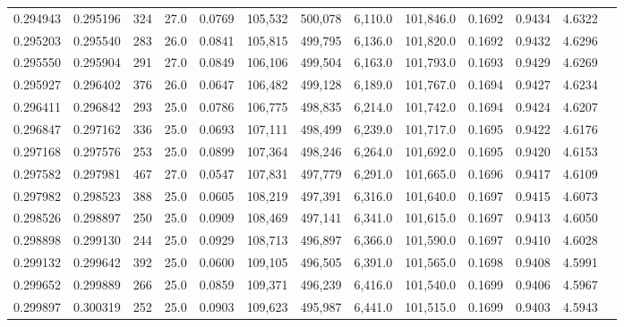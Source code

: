 \begin{tabular}{rrrrrrrrrrrrr}
0.294943 & 0.295196 &   324 & 27.0 &                                     0.0769 & 105,532 & 500,078 &   6,110.0 & 101,846.0 & 0.1692 & 0.9434 & 4.6322 \\
0.295203 & 0.295540 &   283 & 26.0 &                                     0.0841 & 105,815 & 499,795 &   6,136.0 & 101,820.0 & 0.1692 & 0.9432 & 4.6296 \\
0.295550 & 0.295904 &   291 & 27.0 &                                     0.0849 & 106,106 & 499,504 &   6,163.0 & 101,793.0 & 0.1693 & 0.9429 & 4.6269 \\
0.295927 & 0.296402 &   376 & 26.0 &                                     0.0647 & 106,482 & 499,128 &   6,189.0 & 101,767.0 & 0.1694 & 0.9427 & 4.6234 \\
0.296411 & 0.296842 &   293 & 25.0 &                                     0.0786 & 106,775 & 498,835 &   6,214.0 & 101,742.0 & 0.1694 & 0.9424 & 4.6207 \\
0.296847 & 0.297162 &   336 & 25.0 &                                     0.0693 & 107,111 & 498,499 &   6,239.0 & 101,717.0 & 0.1695 & 0.9422 & 4.6176 \\
0.297168 & 0.297576 &   253 & 25.0 &                                     0.0899 & 107,364 & 498,246 &   6,264.0 & 101,692.0 & 0.1695 & 0.9420 & 4.6153 \\
0.297582 & 0.297981 &   467 & 27.0 &                                     0.0547 & 107,831 & 497,779 &   6,291.0 & 101,665.0 & 0.1696 & 0.9417 & 4.6109 \\
0.297982 & 0.298523 &   388 & 25.0 &                                     0.0605 & 108,219 & 497,391 &   6,316.0 & 101,640.0 & 0.1697 & 0.9415 & 4.6073 \\
0.298526 & 0.298897 &   250 & 25.0 &                                     0.0909 & 108,469 & 497,141 &   6,341.0 & 101,615.0 & 0.1697 & 0.9413 & 4.6050 \\
0.298898 & 0.299130 &   244 & 25.0 &                                     0.0929 & 108,713 & 496,897 &   6,366.0 & 101,590.0 & 0.1697 & 0.9410 & 4.6028 \\
0.299132 & 0.299642 &   392 & 25.0 &                                     0.0600 & 109,105 & 496,505 &   6,391.0 & 101,565.0 & 0.1698 & 0.9408 & 4.5991 \\
0.299652 & 0.299889 &   266 & 25.0 &                                     0.0859 & 109,371 & 496,239 &   6,416.0 & 101,540.0 & 0.1699 & 0.9406 & 4.5967 \\
0.299897 & 0.300319 &   252 & 25.0 &                                     0.0903 & 109,623 & 495,987 &   6,441.0 & 101,515.0 & 0.1699 & 0.9403 & 4.5943 \\

\end{tabular}
